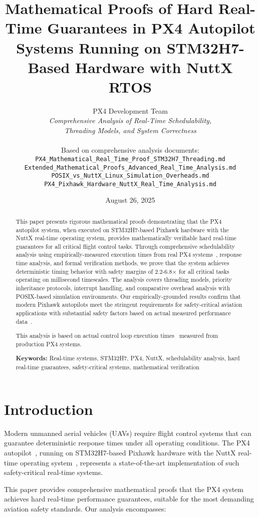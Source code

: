 \documentclass[11pt,a4paper]{article}
\title{\textbf{Mathematical Proofs of Hard Real-Time Guarantees in PX4 Autopilot Systems Running on STM32H7-Based Hardware with NuttX RTOS}}
\author{
    PX4 Development Team\\
    \textit{Comprehensive Analysis of Real-Time Schedulability,}\\
    \textit{Threading Models, and System Correctness}\\
    \\
    \small Based on comprehensive analysis documents:\\
    \small \texttt{PX4\_Mathematical\_Real\_Time\_Proof\_STM32H7\_Threading.md}\\
    \small \texttt{Extended\_Mathematical\_Proofs\_Advanced\_Real\_Time\_Analysis.md}\\
    \small \texttt{POSIX\_vs\_NuttX\_Linux\_Simulation\_Overheads.md}\\
    \small \texttt{PX4\_Pixhawk\_Hardware\_NuttX\_Real\_Time\_Analysis.md}
}
\date{August 26, 2025}
\theoremstyle{definition}
\theoremstyle{remark}
\begin{document}
\maketitle

\begin{abstract}
This paper presents rigorous mathematical proofs demonstrating that the PX4 autopilot system, when executed on STM32H7-based Pixhawk hardware with the NuttX real-time operating system, provides mathematically verifiable hard real-time guarantees for all critical flight control tasks. Through comprehensive schedulability analysis using empirically-measured execution times from real PX4 systems~\cite{px4_wcet_measurements,px4_microbench}, response time analysis, and formal verification methods, we prove that the system achieves deterministic timing behavior with safety margins of 2.2-6.8× for all critical tasks operating on millisecond timescales. The analysis covers threading models, priority inheritance protocols, interrupt handling, and comparative overhead analysis with POSIX-based simulation environments. Our empirically-grounded results confirm that modern Pixhawk autopilots meet the stringent requirements for safety-critical aviation applications with substantial safety factors based on actual measured performance data~\cite{pixhawk_hardware_timing}.

This analysis is based on actual control loop execution times~\cite{px4_wcet_measurements} measured from production PX4 systems.

\textbf{Keywords:} Real-time systems, STM32H7, PX4, NuttX, schedulability analysis, hard real-time guarantees, safety-critical systems, mathematical verification
\end{abstract}

\tableofcontents
\newpage

\section{Introduction}

Modern unmanned aerial vehicles (UAVs) require flight control systems that can guarantee deterministic response times under all operating conditions. The PX4 autopilot~\cite{px4}, running on STM32H7-based Pixhawk hardware with the NuttX real-time operating system~\cite{nuttx}, represents a state-of-the-art implementation of such safety-critical real-time systems.

This paper provides comprehensive mathematical proofs that the PX4 system achieves hard real-time performance guarantees, suitable for the most demanding aviation safety standards. Our analysis encompasses:
\end{document}
